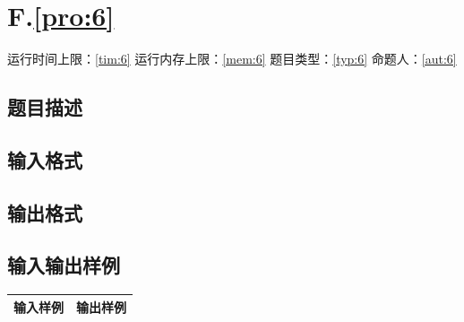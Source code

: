 \documentclass[
	lang=cn,
	color=green
]{elegantbook}
\begin{document}
\newpage
\chapter*{F.\quad \ref*{pro:6}}
\begin{center}
	运行时间上限：\ref*{tim:6} \quad 运行内存上限：\ref*{mem:6} \quad 题目类型：\ref*{typ:6} \quad 命题人：\ref*{aut:6}
\end{center}

\section*{题目描述}

\section*{输入格式}

\section*{输出格式}

\section*{输入输出样例}
\begin{tabularx}{450pt}{X|X}
	\toprule
	输入样例 & 输出样例 \\
	\midrule

	\bottomrule
\end{tabularx}
\end{document}
